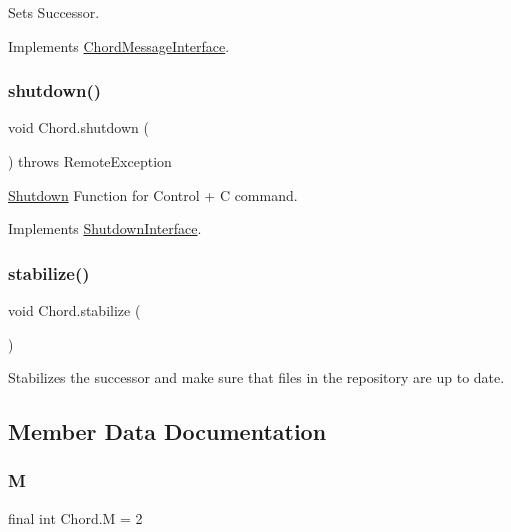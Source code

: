 Sets Successor. 



Implements \hyperlink{interface_chord_message_interface_af6194ad846851fe7a8bd5f6bc8d36163}{Chord\+Message\+Interface}.

\hypertarget{class_chord_a8616150947d5fa4095187325bc9f8a60}{}\label{class_chord_a8616150947d5fa4095187325bc9f8a60} 
\subsubsection{\texorpdfstring{shutdown()}{shutdown()}}
{\footnotesize\ttfamily void Chord.\+shutdown (\begin{DoxyParamCaption}{ }\end{DoxyParamCaption}) throws Remote\+Exception}



\hyperlink{class_shutdown}{Shutdown} Function for Control + C command. 



Implements \hyperlink{interface_shutdown_interface_a16c9cfd61247e825a49564a4daab3286}{Shutdown\+Interface}.

\hypertarget{class_chord_a8a4b7a1cd88cb3f607ada0629f2ff2dd}{}\label{class_chord_a8a4b7a1cd88cb3f607ada0629f2ff2dd} 
\subsubsection{\texorpdfstring{stabilize()}{stabilize()}}
{\footnotesize\ttfamily void Chord.\+stabilize (\begin{DoxyParamCaption}{ }\end{DoxyParamCaption})}



Stabilizes the successor and make sure that files in the repository are up to date. 



\subsection{Member Data Documentation}
\hypertarget{class_chord_a864e0b4011dc157c78a06dd951c6d9ac}{}\label{class_chord_a864e0b4011dc157c78a06dd951c6d9ac} 
\subsubsection{\texorpdfstring{M}{M}}
{\footnotesize\ttfamily final int Chord.\+M = 2\hspace{0.3cm}{\ttfamily [static]}}


